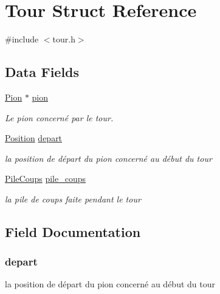 \hypertarget{struct_tour}{\section{Tour Struct Reference}
\label{struct_tour}
}


{\ttfamily \#include $<$tour.\-h$>$}

\subsection*{Data Fields}
\begin{DoxyCompactItemize}
\item 
\hyperlink{struct_pion}{Pion} $\ast$ \hyperlink{struct_tour_a0224d782f98071941365738119daa136}{pion}
\begin{DoxyCompactList}\small\item\em Le pion concerné par le tour. \end{DoxyCompactList}\item 
\hyperlink{struct_position}{Position} \hyperlink{struct_tour_ab702de429f28137453a1ad4197f2ec9f}{depart}
\begin{DoxyCompactList}\small\item\em la position de départ du pion concerné au début du tour \end{DoxyCompactList}\item 
\hyperlink{struct_pile_coups}{Pile\-Coups} \hyperlink{struct_tour_a1e132b1253290931353c35b732b490bf}{pile\-\_\-coups}
\begin{DoxyCompactList}\small\item\em la pile de coups faite pendant le tour \end{DoxyCompactList}\end{DoxyCompactItemize}


\subsection{Field Documentation}
\hypertarget{struct_tour_ab702de429f28137453a1ad4197f2ec9f}{
\subsubsection[{depart}]{ depart}}\label{struct_tour_ab702de429f28137453a1ad4197f2ec9f}


la position de départ du pion concerné au début du tour 

